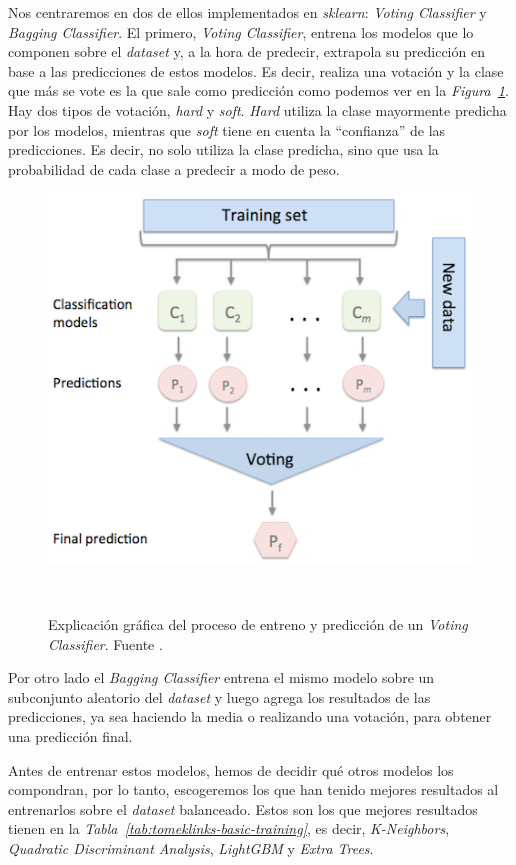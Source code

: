 Nos centraremos en dos de ellos implementados en \textit{sklearn}: \textit{Voting Classifier} y \textit{Bagging Classifier}.
El primero, \textit{Voting Classifier}, entrena los modelos que lo componen sobre el \textit{dataset} y, a la hora de predecir, extrapola su predicción en base a las predicciones de estos modelos. Es decir, realiza una votación y la clase que más se vote es la que sale como predicción como podemos ver en la \textit{Figura\ \ref{fig:voting-classifiers}}. Hay dos tipos de votación, \textit{hard} y \textit{soft}. \textit{Hard} utiliza la clase mayormente predicha por los modelos, mientras que \textit{soft} tiene en cuenta la ``confianza'' de las predicciones. Es decir, no solo utiliza la clase predicha, sino que usa la probabilidad de cada clase a predecir a modo de peso. \cite{Ensemble96:online}

\begin{figure}[!h]
    \centering
    \includegraphics[width=0.7\linewidth]{media/images/majority_voting.png}
    \caption{Explicación gráfica del proceso de entreno y predicción de un \textit{Voting Classifier}. Fuente \cite{Ensemble96:online}.}\ \label{fig:voting-classifiers}
\end{figure}

Por otro lado el \textit{Bagging Classifier} entrena el mismo modelo sobre un subconjunto aleatorio del \textit{dataset} y luego agrega los resultados de las predicciones, ya sea haciendo la media o realizando una votación, para obtener una predicción final.\ \cite{sklearne53:online}

Antes de entrenar estos modelos, hemos de decidir qué otros modelos los compondran, por lo tanto, escogeremos los que han tenido mejores resultados al entrenarlos sobre el \textit{dataset} balanceado. Estos son los que mejores resultados tienen en la \textit{Tabla\ \ref{tab:tomeklinks-basic-training}}, es decir, \textit{K-Neighbors}, \textit{Quadratic Discriminant Analysis}, \textit{LightGBM} y \textit{Extra Trees}.


